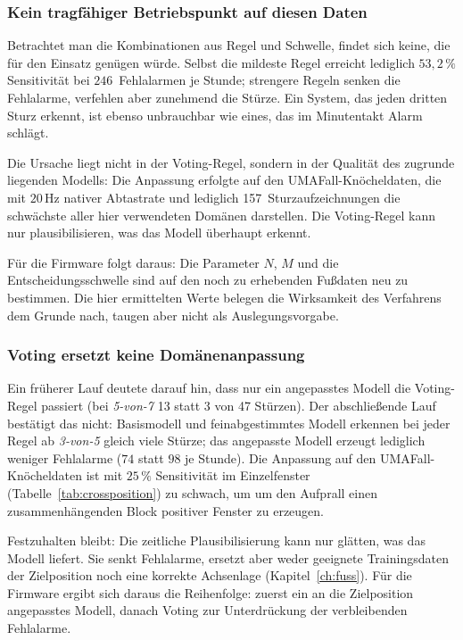 \documentclass[11pt,a4paper,oneside]{report}
\begin{document}
\subsubsection{Kein tragfähiger Betriebspunkt auf diesen Daten}

Betrachtet man die Kombinationen aus Regel und Schwelle, findet sich
keine, die für den Einsatz genügen würde. Selbst die mildeste Regel
erreicht lediglich $53{,}2\,\%$ Sensitivität bei $246$~Fehlalarmen je
Stunde; strengere Regeln senken die Fehlalarme, verfehlen aber
zunehmend die Stürze. Ein System, das jeden dritten Sturz erkennt,
ist ebenso unbrauchbar wie eines, das im Minutentakt Alarm schlägt.

Die Ursache liegt nicht in der Voting-Regel, sondern in der Qualität
des zugrunde liegenden Modells: Die Anpassung erfolgte auf den
UMAFall-Knöcheldaten, die mit $20$\,Hz nativer Abtastrate und
lediglich 157~Sturzaufzeichnungen die schwächste aller hier
verwendeten Domänen darstellen. Die Voting-Regel kann nur
plausibilisieren, was das Modell überhaupt erkennt.

Für die Firmware folgt daraus: Die Parameter $N$, $M$ und die
Entscheidungsschwelle sind auf den noch zu erhebenden Fußdaten neu zu
bestimmen. Die hier ermittelten Werte belegen die Wirksamkeit des
Verfahrens dem Grunde nach, taugen aber nicht als
Auslegungsvorgabe.

\subsubsection{Voting ersetzt keine Domänenanpassung}

Ein früherer Lauf deutete darauf hin, dass nur ein angepasstes Modell
die Voting-Regel passiert (bei \emph{5-von-7} 13 statt 3 von 47
Stürzen). Der abschließende Lauf bestätigt das nicht: Basismodell und
feinabgestimmtes Modell erkennen bei jeder Regel ab \emph{3-von-5}
gleich viele Stürze; das angepasste Modell erzeugt lediglich weniger
Fehlalarme ($74$ statt $98$ je Stunde). Die Anpassung auf den
UMAFall-Knöcheldaten ist mit $25\,\%$ Sensitivität im Einzelfenster
(Tabelle~\ref{tab:crossposition}) zu schwach, um um den Aufprall einen
zusammenhängenden Block positiver Fenster zu erzeugen.

Festzuhalten bleibt: Die zeitliche Plausibilisierung kann nur glätten,
was das Modell liefert. Sie senkt Fehlalarme, ersetzt aber weder
geeignete Trainingsdaten der Zielposition noch eine korrekte
Achsenlage (Kapitel~\ref{ch:fuss}). Für die Firmware ergibt sich
daraus die Reihenfolge: zuerst ein an die Zielposition angepasstes
Modell, danach Voting zur Unterdrückung der verbleibenden
Fehlalarme.
\end{document}
